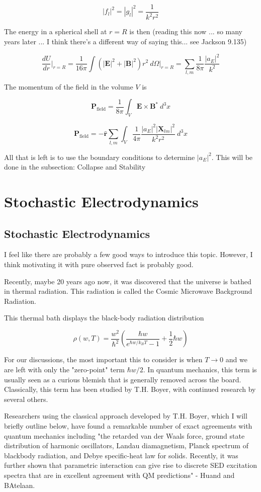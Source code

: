 \documentclass {article}
\renewcommand\vec{\mathbf}
\let\OldHat\hat
\renewcommand{\hat}[1]{\OldHat{\mathbf{#1}}}
\begin{document}
$$|f_l|^2 = |g_l|^2 =  \frac 1 {k^2 r^2}$$

The energy in a spherical shell at $r =R$ is then (reading this now ... so many years later ... I think there's a different way of saying this... see Jackson 9.135)

$$\frac {dU} {dr} \bigg|_{r=R} = \frac 1 {16 \pi} \int \left( |\vec E  |^2 + |\vec B |^2 \right) r^2 ~ d\Omega  \bigg|_{r=R} = \sum_{l, m} \frac 1 {8 \pi} \frac {|a_E|^2}{k^2}$$

The momentum of the field in the volume $V$ is

$$\vec P_{\text{field}} = \frac 1 {8 \pi} \int_V \vec E \times \vec B^* ~ d^3x$$ 

$$\vec P_{\text{field}} = - \hat r \sum_{l, m}   \int_V \frac 1 {4 \pi}  \frac {|a_E|^2 |\vec X_{lm} |^2}{k^2 r^2} ~ d^3x $$

All that is left is to use the boundary conditions to determine $|a_E|^2$. This will be done in the subsection: Collapse and Stability


\newpage

\section{Stochastic Electrodynamics}
\subsection{Stochastic Electrodynamics}
I feel like there are probably a few good ways to introduce this topic. However, I think motivating it with pure observed fact is probably good.

Recently, maybe 20 years ago now, it was discovered that the universe is bathed in thermal radiation. This radiation is called the Cosmic Microwave Background Radiation. 

This thermal bath displays the black-body radiation distribution

$$\rho(w, T) = \frac {w^2} {\hbar^2} \left( \frac{ \hbar w}{e^{\hbar w / k_B T} - 1} + \frac 1 2 \hbar w    \right)$$

For our discussions, the most important this to consider is when $T \rightarrow 0$ and we are left with only the "zero-point" term $\hbar w / 2$. In quantum mechanics, this term is usually seen as a curious blemish that is generally removed across the board. Classically, this term has been studied by T.H. Boyer, with continued research by several others.

Researchers using the classical approach developed by T.H. Boyer, which I will briefly outline below, have found a remarkable number of exact agreements with quantum mechanics including "the retarded van der Waals force, ground state distribution of harmonic oscillators, Landau diamagnetism, Planck spectrum of blackbody radiation, and Debye specific-heat law for solids. Recently, it was further shown that parametric interaction can give rise to discrete SED excitation spectra that are in excellent agreement with QM predictions" - Huand and BAtelaan. 
\end{document}
